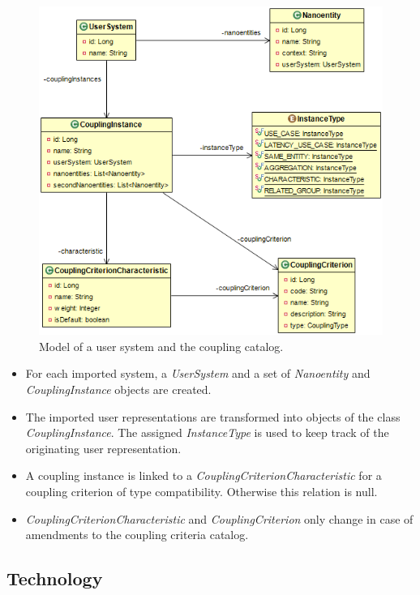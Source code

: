 \begin{figure}[H]
	\begin{center}
		\includegraphics[scale=0.5]{diagrams/CouplingCriterion.png}
		\caption{Model of a user system and the coupling catalog.}
		\label{fig:datamodel}
	\end{center}
\end{figure}

\begin{itemize}
\item For each imported system, a \textit{UserSystem} and a set of \textit{Nanoentity} and \textit{CouplingInstance} objects are created.
\item The imported user representations are transformed into objects of the class \textit{CouplingInstance}. The assigned \textit{InstanceType} is used to keep track of the originating user representation.
\item A coupling instance is linked to a \textit{CouplingCriterionCharacteristic} for a coupling criterion of type compatibility. Otherwise this relation is null.
\item \textit{CouplingCriterionCharacteristic} and \textit{CouplingCriterion} only change in case of amendments to the coupling criteria catalog.
\end{itemize}

\subsection{Technology}
\label{subsec:technology}

